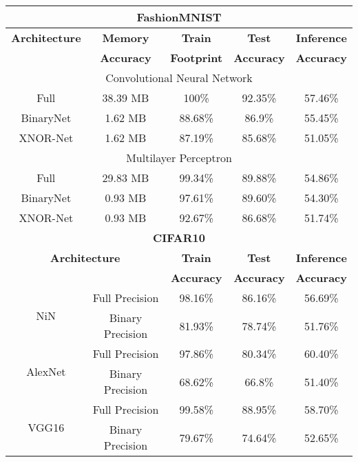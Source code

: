 \begin{table}[!htb]
\begin{center}
\renewcommand\arraystretch{1.5}
\fontsize{6.7pt}{6.7pt}\selectfont
\begin{tabular}{|c|c|c|c|c|}
\hline
\multicolumn{5}{|c|}{\textbf{FashionMNIST}}\\
\hline
\textbf{Architecture} & \textbf{Memory} & \textbf{Train}  & \textbf{Test}  & \textbf{Inference}  \\
 & \textbf{Accuracy} &  \textbf{Footprint} & \textbf{Accuracy} & \textbf{Accuracy}  \\
\hline
\multicolumn{5}{|c|}{Convolutional Neural Network}\\
Full & 38.39 MB & 100\% & 92.35\% & \cellcolor{red!25}57.46\%\\
BinaryNet & 1.62 MB & 88.68\% & 86.9\% & \cellcolor{green!25}55.45\%\\
XNOR-Net & 1.62 MB & 87.19\% & 85.68\% & \cellcolor{green!25}51.05\%\\ %
\hline
\multicolumn{5}{|c|}{Multilayer Perceptron}\\
Full & 29.83 MB & 99.34\% & 89.88\% & \cellcolor{red!25}54.86\% \\
BinaryNet & 0.93 MB & 97.61\% & 89.60\% & \cellcolor{green!25}54.30\%\\
XNOR-Net & 0.93 MB & 92.67\% & 86.68\% & \cellcolor{green!25}51.74\%\\ %
\hline
\hline
\multicolumn{5}{|c|}{\textbf{CIFAR10}} \\
\hline
\multicolumn{2}{|c|}{\textbf{Architecture}} & \textbf{Train}  & \textbf{Test}  & \textbf{Inference}  \\
 \multicolumn{2}{|c|}{} & \textbf{Accuracy} & \textbf{Accuracy} & \textbf{Accuracy}  \\
\hline
\multirow{2}{*}{NiN} & Full Precision & 98.16\% & 86.16\% & \cellcolor{red!25}56.69\% \\
& Binary Precision & 81.93\% & 78.74\% & \cellcolor{green!25}51.76\% \\
\hline
\multirow{2}{*}{AlexNet} & Full Precision & 97.86\% & 80.34\% & \cellcolor{red!25}60.40\% \\
& Binary Precision & 68.62\% & 66.8\% & \cellcolor{green!25}51.40\% \\
\hline
\multirow{2}{*}{VGG16} & Full Precision & 99.58\% & 88.95\% & \cellcolor{red!25}58.70\%\\
& Binary Precision & 79.67\% & 74.64\% & \cellcolor{green!25}52.65\%\\

\end{tabular}
\end{center}
\end{table}
